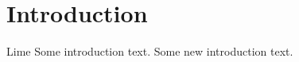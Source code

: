 \chapter{Introduction}
Lime \cite{ribeiro2016should}
Some introduction text.
Some new introduction text.
